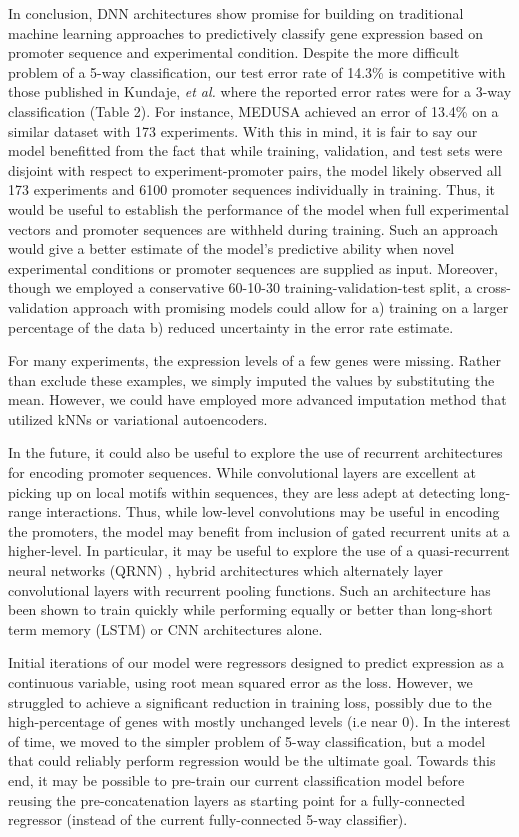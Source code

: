 \documentclass{article}
\begin{document}
In conclusion, DNN architectures show promise for building on traditional machine learning approaches to predictively classify gene expression based on promoter sequence and experimental condition. Despite the more difficult problem of a 5-way classification, our test error rate of 14.3\% is competitive with those published in Kundaje, \textit{et al.} \cite{Kundaje:2007hs} where the reported error rates were for a 3-way classification (Table 2). For instance, MEDUSA achieved an error of 13.4\% on a similar dataset with 173 experiments. With this in mind, it is fair to say our model benefitted from the fact that while training, validation, and test sets were disjoint with respect to experiment-promoter pairs, the model likely observed all 173 experiments and 6100 promoter sequences individually in training. Thus, it would be useful to establish the performance of the model when full experimental vectors and promoter sequences are withheld during training. Such an approach would give a better estimate of the model’s predictive ability when novel experimental conditions or promoter sequences are supplied as input. Moreover, though we employed a conservative 60-10-30 training-validation-test split, a cross-validation approach with promising models could allow for a) training on a larger percentage of the data b) reduced uncertainty in the error rate estimate.

For many experiments, the expression levels of a few genes were missing. Rather than exclude these examples, we simply imputed the values by substituting the mean. However, we could have employed more advanced imputation method that utilized kNNs or variational autoencoders.

In the future, it could also be useful to explore the use of recurrent architectures for encoding promoter sequences. While convolutional layers are excellent at picking up on local motifs within sequences, they are less adept at detecting long-range interactions. Thus, while low-level convolutions may be useful in encoding the promoters, the model may benefit from inclusion of gated recurrent units at a higher-level. In particular, it may be useful to explore the use of a quasi-recurrent neural networks (QRNN) \cite{Bradbury:2016ul}, hybrid architectures which alternately layer convolutional layers with recurrent pooling functions. Such an architecture has been shown to train quickly while performing equally or better than long-short term memory (LSTM) or CNN architectures alone.

Initial iterations of our model were regressors designed to predict expression as a continuous variable, using root mean squared error as the loss. However, we struggled to achieve a significant reduction in training loss, possibly due to the high-percentage of genes with mostly unchanged levels (i.e near 0). In the interest of time, we moved to the simpler problem of 5-way classification, but a model that could reliably perform regression would be the ultimate goal. Towards this end, it may be possible to pre-train our current classification model before reusing the pre-concatenation layers as starting point for a fully-connected regressor (instead of the current fully-connected 5-way classifier).  
\end{document}
